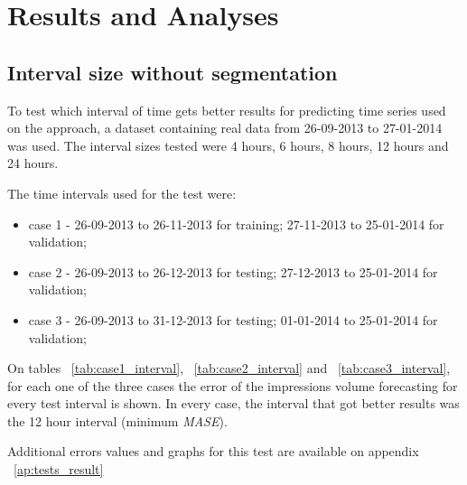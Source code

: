 \chapter{Results and Analyses} \label{chap:concl}

\section*{}

\section{Interval size without segmentation}

To test which interval of time gets better results for predicting time series
used on the approach, a dataset containing real data from 26-09-2013 to
27-01-2014 was used. The interval sizes tested were 4 hours, 6 hours, 8 hours,
12 hours and 24 hours.

The time intervals used for the test were:
\begin{itemize}
\item case 1 - 26-09-2013 to 26-11-2013 for training;
27-11-2013 to 25-01-2014 for validation;
\item case 2 - 26-09-2013 to 26-12-2013 for testing; 27-12-2013 to 25-01-2014
for validation;
\item case 3 - 26-09-2013 to 31-12-2013 for testing; 01-01-2014 to 25-01-2014
for validation;
\end{itemize}

On tables ~\ref{tab:case1_interval}, ~\ref{tab:case2_interval} and
~\ref{tab:case3_interval}, for each one of the three cases the error of the
impressions volume forecasting for every test interval is shown.
In every case, the interval that got better results was the 12 hour interval
(minimum \emph{MASE}).

Additional errors values and graphs for this test are available on appendix
~\ref{ap:tests_result}

